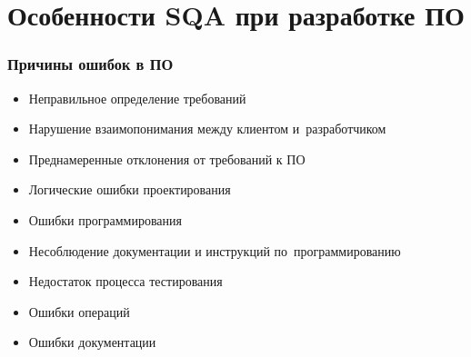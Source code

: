 \documentclass{../industrial-development}
\begin{document}
\section{Особенности SQA при разработке ПО}
\begin{frame} \frametitle{Причины ошибок в ПО}
 	 \begin{itemize}
\item Неправильное определение требований
\item Нарушение взаимопонимания между клиентом и~разработчиком
\item Преднамеренные отклонения от требований к ПО
\item Логические ошибки проектирования
\item Ошибки программирования
\item Несоблюдение документации и инструкций по~программированию
\item Недостаток процесса тестирования
\item Ошибки операций
\item Ошибки документации
  	\end{itemize}
\end{frame}

\lecturenotes
\end{document}

